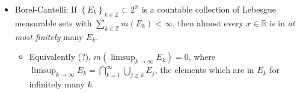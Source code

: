 \begin{concept}

\envlist

\begin{itemize}
\tightlist
\item
  Borel-Cantelli: If
  \(\left\{{E_k}\right\}_{k\in{\mathbb{Z}}}\subset 2^{\mathbb{R}}\) is a
  countable collection of Lebesgue measurable sets with
  \(\sum_{k\in {\mathbb{Z}}} m(E_k) < \infty\), then almost every
  \(x\in {\mathbb{R}}\) is in \emph{at most finitely} many \(E_k\).

  \begin{itemize}
  \tightlist
  \item
    Equivalently (?), \(m(\limsup_{k\to\infty} E_k) = 0\), where
    \(\limsup_{k\to\infty} E_k = \displaystyle\bigcap_{k=1}^\infty \displaystyle\bigcup_{j\geq k} E_j\),
    the elements which are in \(E_k\) for infinitely many \(k\).
  \end{itemize}
\end{itemize}

\end{concept}

